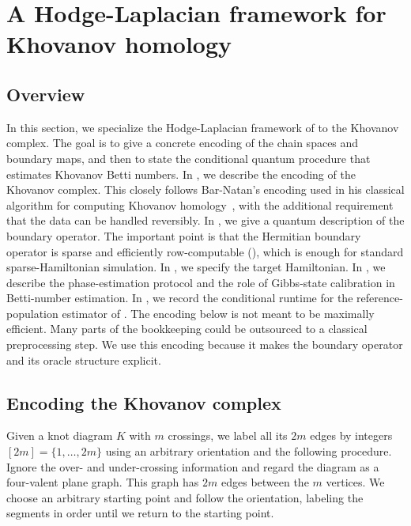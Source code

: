 \documentclass[a4paper,onecolumn,unpublished]{quantumarticle}
\theoremstyle{plain}
\theoremstyle{definition}
\theoremstyle{definition}
\numberwithin{equation}{section}
\begin{document}
\section{A Hodge-Laplacian framework for Khovanov homology}\label{sec:kh_quantum_algorithm}
\label{sec:algorithm}

\subsection{Overview}
 
In this section, we specialize the Hodge-Laplacian framework of  to the Khovanov complex.  The goal is to give a concrete encoding of the chain spaces and boundary maps, and then to state the conditional quantum procedure that estimates Khovanov Betti numbers.
In , we describe the encoding of the Khovanov complex.  This closely follows Bar-Natan's encoding used in his classical algorithm for computing Khovanov homology~\cite{BN1}, with the additional requirement that the data can be handled reversibly.
In , we give a quantum description of the boundary operator.  The important point is that the Hermitian boundary operator is sparse and efficiently row-computable (), which is enough for standard sparse-Hamiltonian simulation.
In , we specify the target Hamiltonian. In , we describe the phase-estimation protocol and the role of Gibbs-state calibration in Betti-number estimation. In , we record the conditional runtime for the reference-population estimator of .
The encoding below is not meant to be maximally efficient.  Many parts of the bookkeeping could be outsourced to a classical preprocessing step.  We use this encoding because it makes the boundary operator and its oracle structure explicit.

\subsection{Encoding the Khovanov complex}  \label{subsec:Kh-encoding}
Given a knot diagram $K$ with $m$ crossings, we label all its $2m$ edges by integers $[2m]=\{1,\dots,2m\}$ using an arbitrary orientation and the following procedure.  Ignore the over- and under-crossing information and regard the diagram as a four-valent plane graph.  This graph has $2m$ edges between the $m$ vertices.  We choose an arbitrary starting point and follow the orientation, labeling the segments in order until we return to the starting point.
\end{document}
